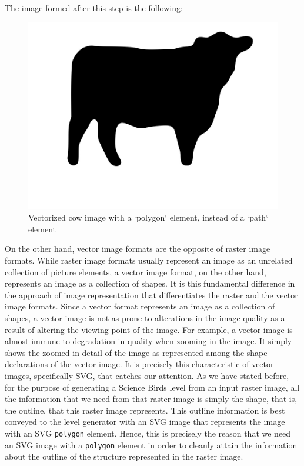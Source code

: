 \documentclass{dalthesis}
\begin{document}
\begin{enumerate}
  The image formed after this step is the following:

  \begin{figure}[H]
    \centering
		\caption{Vectorized cow image with a `polygon` element, instead of a `path` element}
    \includegraphics[width=\textwidth,height=\textheight,keepaspectratio]{process/cow-black-and-white-denoised-polygon.jpg}
  \end{figure}
\end{enumerate}

On the other hand, vector image formats are the opposite of raster image formats. While raster image formats usually represent an image as an unrelated collection of picture elements, a vector image format, on the other hand, represents an image as a collection of shapes. It is this fundamental difference in the approach of image representation that differentiates the raster and the vector image formats. Since a vector format represents an image as a collection of shapes, a vector image is not as prone to alterations in the image quality as a result of altering the viewing point of the image. For example, a vector image is almost immune to degradation in quality when zooming in the image. It simply shows the zoomed in detail of the image as represented among the shape declarations of the vector image. It is precisely this characteristic of vector images, specifically SVG, that catches our attention. As we have stated before, for the purpose of generating a Science Birds level from an input raster image, all the information that we need from that raster image is simply the shape, that is, the outline, that this raster image represents. This outline information is best conveyed to the level generator with an SVG image that represents the image with an SVG \lstinline{polygon} element. Hence, this is precisely the reason that we need an SVG image with a \lstinline{polygon} element in order to cleanly attain the information about the outline of the structure represented in the raster image.
\end{document}
